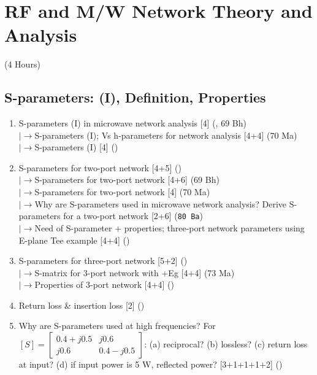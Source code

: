 \documentclass[12pt]{article}
\newcommand{\lb}{\\$\left|\rightarrow\right.$}
\begin{document}
\pagebreak
\section{RF and M/W Network Theory and Analysis}
\begin{center}(4 Hours)\end{center}

  \subsection{S-parameters: (I), Definition, Properties}
    \begin{enumerate}[topsep=0pt, noitemsep]
      \item S-parameters (I) in microwave network analysis \hfill [4] (, 69 Bh)
        \lb S-parameters (I); Vs h-parameters for network analysis \hfill [4+4] (70 Ma)
        \lb S-parameters (I) \hfill [4] ()
      \item S-parameters for two-port network \hfill [4+5] ()
        \lb S-parameters for two-port network \hfill [4+6] (69 Bh)
        \lb S-parameters for two-port network \hfill [4] (70 Ma)
        \lb Why are S-parameters used in microwave network analysis? Derive S-parameters for a two-port network \hfill [2+6] (\texttt{80 Ba})
        \lb Need of S-parameter + properties; three-port network parameters using E-plane Tee example \hfill [4+4] ()
      \item S-parameters for three-port network \hfill [5+2] ()
        \lb S-matrix for 3-port network with +Eg \hfill [4+4] (73 Ma)
        \lb Properties of 3-port network \hfill [4+4] ()
      \item Return loss \& insertion loss \hfill [2] ()
      \item Why are S-parameters used at high frequencies? For $[S]=\begin{bmatrix}0.4{+}j0.5 & j0.6\\ j0.6 & 0.4{-}j0.5\end{bmatrix}$: (a) reciprocal? (b) lossless? (c) return loss at input? (d) if input power is 5 W, reflected power? \hfill [3+1+1+1+2] ()
    \end{enumerate}
\end{document}
